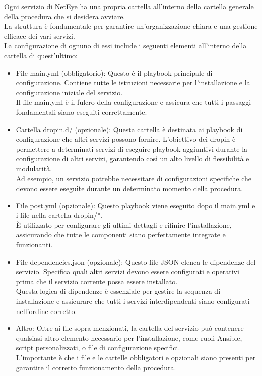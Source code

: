Ogni servizio di NetEye ha una propria cartella all'interno della cartella
generale della procedura che si desidera avviare.\\ La struttura è fondamentale
per garantire un'organizzazione chiara e una gestione efficace dei vari servizi.\\
La configurazione di ognuno di essi include i seguenti elementi all'interno
della cartella di quest'ultimo:
\begin{itemize}
  \item File main.yml (obbligatorio): Questo è il playbook principale di
    configurazione. Contiene tutte le istruzioni necessarie per l'installazione e
    la configurazione iniziale del servizio.\\ Il file main.yml è il fulcro della
    configurazione e assicura che tutti i passaggi fondamentali siano eseguiti correttamente.

  \item Cartella dropin.d/ (opzionale): Questa cartella è destinata ai playbook di
    configurazione che altri servizi possono fornire. L'obiettivo dei dropin è
    permettere a determinati servizi di eseguire playbook aggiuntivi durante la
    configurazione di altri servizi, garantendo così un alto livello di flessibilità
    e modularità.\\ Ad esempio, un servizio potrebbe necessitare di
    configurazioni specifiche che devono essere eseguite durante un determinato
    momento della procedura.

  \item File post.yml (opzionale): Questo playbook viene eseguito dopo il main.yml
    e i file nella cartella dropin/*.\\ È utilizzato per configurare gli ultimi
    dettagli e rifinire l'installazione, assicurando che tutte le componenti siano
    perfettamente integrate e funzionanti.

  \item File dependencies.json (opzionale): Questo file JSON elenca le
    dipendenze del servizio. Specifica quali altri servizi devono essere configurati
    e operativi prima che il servizio corrente possa essere installato.\\ Questa
    logica di dipendenze è essenziale per gestire la sequenza di installazione e
    assicurare che tutti i servizi interdipendenti siano configurati nell'ordine
    corretto.

  \item Altro: Oltre ai file sopra menzionati, la cartella del servizio può contenere
    qualsiasi altro elemento necessario per l'installazione, come ruoli Ansible,
    script personalizzati, o file di configurazione specifici.\\ L'importante è
    che i file e le cartelle obbligatori e opzionali siano presenti per
    garantire il corretto funzionamento della procedura.
\end{itemize}
